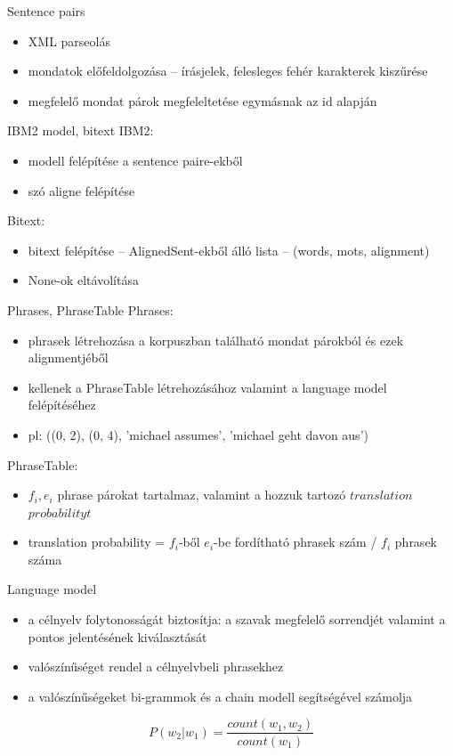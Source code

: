 \begin{frame}{Sentence pairs}
	\begin{itemize}
		\item XML parseolás
		\item mondatok előfeldolgozása -- írásjelek, felesleges fehér karakterek kiszűrése
		\item megfelelő mondat párok megfeleltetése egymásnak az id alapján
	\end{itemize}

\end{frame}

\begin{frame}{IBM2 model, bitext}
	IBM2:
	\begin{itemize}
		\item modell felépítése a sentence paire-ekből
		\item szó aligne felépítése
	\end{itemize}
	
	Bitext:
	\begin{itemize}
		\item bitext felépítése -- AlignedSent-ekből álló lista -- (words, mots, alignment)
		\item None-ok eltávolítása
	\end{itemize}
\end{frame}

\begin{frame}{Phrases, PhraseTable}
	Phrases:
	\begin{itemize}
		\item phrasek létrehozása a korpuszban található mondat párokból és ezek alignmentjéből
		\item kellenek a PhraseTable létrehozásához valamint a language model felépítéséhez
		\item pl: ((0, 2), (0, 4), 'michael assumes', 'michael geht davon aus')	
	\end{itemize}
	
	PhraseTable:
	\begin{itemize}
		\item $f_i, e_i$ phrase párokat tartalmaz, valamint a hozzuk tartozó $translation$ $probabilityt$
		\item translation probability = $f_i$-ből $e_i$-be fordítható phrasek szám / $f_i$ phrasek száma
	\end{itemize}
	
\end{frame}

\begin{frame}{Language model}
	\begin{itemize}
		\item a célnyelv folytonosságát biztosítja: a szavak megfelelő sorrendjét valamint a pontos jelentésének kiválasztását
		\item valószínűséget rendel a célnyelvbeli phrasekhez
		\item a valószínűségeket bi-grammok és a chain modell segítségével számolja
	\end{itemize}
	\begin{equation}
		P(w_2|w_1) = \frac{count(w_1, w_2)}{count(w_1)}
	\end{equation}
\end{frame}

